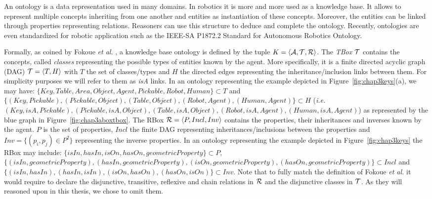 \documentclass[a4paper,11pt,twoside]{StyleThese}
\begin{document}
An ontology is a data representation used in many domains. In robotics it is more and more used as a knowledge base. It allows to represent multiple concepts inheriting from one another and entities as instantiation of these concepts. Moreover, the entities can be linked through properties representing relations. Reasoners can use this structure to deduce and complete the ontology. Recently, ontologies are even standardized for robotic application such as the IEEE-SA P1872.2 Standard for Autonomous Robotics Ontology.

Formally, as coined by Fokoue \textit{et al.} \cite{fokoue2006summary}, a knowledge base ontology is defined by the tuple $K = \langle \mathcal{A}, \mathcal{T}, \mathcal{R} \rangle$. 
The \textit{TBox} $\mathcal{T}$ contains the concepts, called \textit{classes} representing the possible types of entities known by the agent. More specifically, it is a finite directed acyclic graph (DAG) $\mathcal{T} = \langle T, H \rangle$ with $T$ the set of classes/types and $H$ the directed edges representing the inheritance/inclusion links between them. For simplicity purposes we will refer to them as \textit{isA} links. In an ontology representing the example depicted in Figure~\ref{fig:chap3keys}(a), we may have: $\{Key, Table, Area, Object, Agent, Pickable, Robot, Human\} \subset T$ and $\{(Key, Pickable), (Pickable, Object), (Table, Object), (Robot, Agent), (Human, Agent)\} \subset H$ (\textit{i.e.} $(Key, isA, Pickable), (Pickable, isA, Object), (Table, isA, Object), (Robot, isA, Agent), (Human, isA, Agent)$) as represented by the blue graph in Figure~\ref{fig:chap3aboxtbox}.
The RBox $\mathcal{R} = \langle P, Incl, Inv \rangle$ contains the properties, their inheritances and inverses known by the agent. $P$ is the set of properties, $Incl$ the finite DAG representing inheritances/inclusions between the properties and $Inv = \{(p_i, p_j) \in P^2\}$ representing the inverse properties. In an ontology representing the example depicted in Figure~\ref{fig:chap3keys} the RBox may include: $\{isIn, hasIn, isOn, hasOn, geometricProperty\} \subset P$, $\{(isIn, geometricProperty), (hasIn, geometricProperty), (isOn, geometricProperty), (hasOn, geometricProperty)\} \subset Incl$ and $\{(isIn, hasIn), (hasIn, isIn), (isOn, hasOn), (hasOn, isOn)\} \subset Inv$. Note that to fully match the definition of Fokoue \textit{et al.} \cite{fokoue2006summary} it would require to declare the disjunctive, transitive, reflexive and chain relations in $\mathcal{R}$ and the disjunctive classes in $\mathcal{T}$. As they will reasoned upon in this thesis, we chose to omit them.
\end{document}
